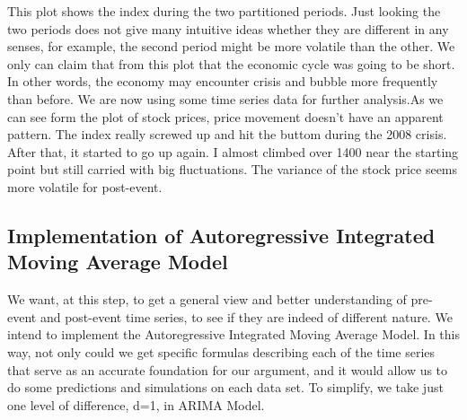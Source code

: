 \documentclass[letterpaper,10pt,english]{/Users/edwsurewin/anaconda/lib/python2.7/site-packages/sphinx/texinputs/sphinxhowto}
\begin{document}
This plot shows the index during the two partitioned periods. Just
looking the two periods does not give many intuitive ideas whether they
are different in any senses, for example, the second period might be
more volatile than the other. We only can claim that from this plot that
the economic cycle was going to be short. In other words, the economy
may encounter crisis and bubble more frequently than before. We are now
using some time series data for further analysis.As we can see form the plot of stock prices, price movement doesn't have
an apparent pattern. The index really screwed up and hit the buttom
during the 2008 crisis. After that, it started to go up again. I almost
climbed over 1400 near the starting point but still carried with big
fluctuations. The variance of the stock price seems more volatile for
post-event.\subsection{Implementation of Autoregressive Integrated Moving Average
Model}\label{implementation-of-autoregressive-integrated-moving-average-model}We want, at this step, to get a general view and better understanding of
pre-event and post-event time series, to see if they are indeed of
different nature. We intend to implement the Autoregressive Integrated
Moving Average Model. In this way, not only could we get specific
formulas describing each of the time series that serve as an accurate
foundation for our argument, and it would allow us to do some
predictions and simulations on each data set. To simplify, we take just
one level of difference, d=1, in ARIMA Model.

\iffalse

\end{document}
